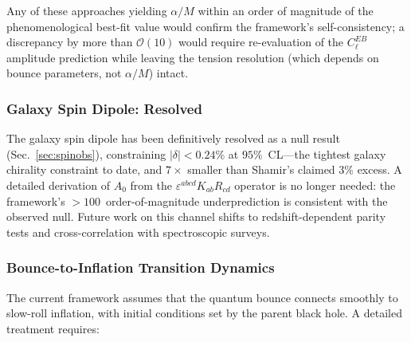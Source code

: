 \documentclass[aps,prd,twocolumn,superscriptaddress,showpacs,preprintnumbers,nofootinbib,longbibliography,floatfix]{revtex4-2}
\begin{document}
Any of these approaches yielding $\alpha/M$ within an order of magnitude of the phenomenological best-fit value would confirm the framework's self-consistency; a discrepancy by more than $\mathcal{O}(10)$ would require re-evaluation of the $C_\ell^{EB}$ amplitude prediction while leaving the tension resolution (which depends on bounce parameters, not $\alpha/M$) intact.

\subsubsection{Galaxy Spin Dipole: Resolved}

The galaxy spin dipole has been definitively resolved as a null result (Sec.~\ref{sec:spinobs}), constraining $|\delta| < 0.24\%$ at $95\%$~CL---the tightest galaxy chirality constraint to date, and $7\times$ smaller than Shamir's claimed $3\%$ excess. A detailed derivation of $A_0$ from the $\varepsilon^{abcd}K_{ab}R_{cd}$ operator is no longer needed: the framework's $>100$~order-of-magnitude underprediction is consistent with the observed null. Future work on this channel shifts to redshift-dependent parity tests and cross-correlation with spectroscopic surveys.

\subsubsection{Bounce-to-Inflation Transition Dynamics}

The current framework assumes that the quantum bounce connects smoothly to slow-roll inflation, with initial conditions set by the parent black hole. A detailed treatment requires:
\end{document}
